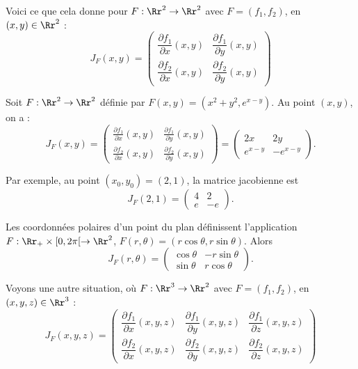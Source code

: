 \documentclass[11pt, class=report,crop=false]{standalone}
\begin{document}
\bigskip

Voici ce que cela donne pour $F : \Rr^2 \to \Rr^2$ avec $F = (f_1,f_2)$, en $(x,y) \in \Rr^2$ :
$$
J_F(x,y) = 
\begin{pmatrix}
\dfrac{\partial f_1}{\partial x} (x,y) & \dfrac{\partial f_1}{\partial y} (x,y) \\
\dfrac{\partial f_2}{\partial x} (x,y) & \dfrac{\partial f_2}{\partial y} (x,y)
\end{pmatrix}
$$

\begin{exemple}
Soit $F : \Rr^2 \to \Rr^2$ définie par $F(x,y) = (x^2 + y^2 , e^{x-y})$.
Au point $(x,y)$, on a :
$$
J_F(x,y) = 
\begin{pmatrix}
\frac{\partial f_1}{\partial x} (x,y) & \frac{\partial f_1}{\partial y} (x,y) \\
\frac{\partial f_2}{\partial x} (x,y) & \frac{\partial f_2}{\partial y} (x,y)
\end{pmatrix}
= 
\begin{pmatrix}
2x & 2y \\
e^{x-y} & -e^{x-y} 
\end{pmatrix}.
$$

Par exemple, au point $(x_0,y_0)=(2,1)$, la matrice jacobienne est
$$J_F(2,1) = 
\begin{pmatrix}
4 & 2 \\ e & -e 
\end{pmatrix}.$$
\end{exemple}

\begin{exemple}
Les coordonnées polaires d'un point du plan définissent l'application
$F : \Rr_+\times [0,2\pi[\to \Rr^2$, $F(r,\theta) = (r\cos \theta ,r\sin \theta )$.
Alors
$$J_F (r,\theta) 
= \begin{pmatrix}
\cos \theta &-r\sin \theta \\
\sin \theta &r\cos \theta 
\end{pmatrix}.$$

\end{exemple}

\bigskip
Voyons une autre situation, où $F : \Rr^3 \to \Rr^2$ avec $F = (f_1,f_2)$, en $(x,y,z) \in \Rr^3$ :
$$
J_F(x,y,z) = 
\begin{pmatrix}
\dfrac{\partial f_1}{\partial x} (x,y,z) & \dfrac{\partial f_1}{\partial y} (x,y,z) & \dfrac{\partial f_1}{\partial z} (x,y,z) 
\\
\dfrac{\partial f_2}{\partial x} (x,y,z) & \dfrac{\partial f_2}{\partial y} (x,y,z) & \dfrac{\partial f_2}{\partial z} (x,y,z)
\end{pmatrix}
$$
\end{document}
